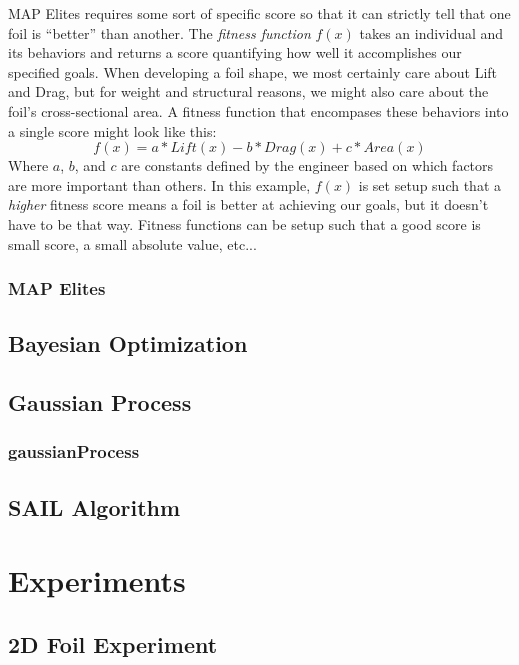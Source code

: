 \documentclass{sig-alternate}
\begin{document}
MAP Elites requires some sort of specific score so that it can strictly tell that one foil is ``better'' than another.
The \textit{fitness function} $f(x)$ takes an individual and its behaviors and returns a score quantifying how well it accomplishes our specified goals.
When developing a foil shape, we most certainly care about Lift and Drag, but for weight and structural reasons, we might also care about the foil’s cross-sectional area.
A fitness function that encompases these behaviors into a single score might look like this:
$$f(x) = a*Lift(x) - b *Drag(x) + c*Area(x)$$
Where $a$, $b$, and $c$ are constants defined by the engineer based on which factors are more important than others.
In this example, $f(x)$ is set setup such that a \textit{higher} fitness score means a foil is better at achieving our goals, but it doesn't have to be that way.
Fitness functions can be setup such that a good score is small score, a small absolute value, etc...

\subsubsection{MAP Elites}
\label{MAPElitesSub}

\subsection{Bayesian Optimization}
\label{bayesianOptimization}

\subsection{Gaussian Process}
\subsubsection{gaussianProcess}

\subsection{SAIL Algorithm}
\label{SAILAlgorithm}

\section{Experiments}
\label{experiments}

\subsection{2D Foil Experiment}
\label{2DFoilExperiment}
\end{document}
